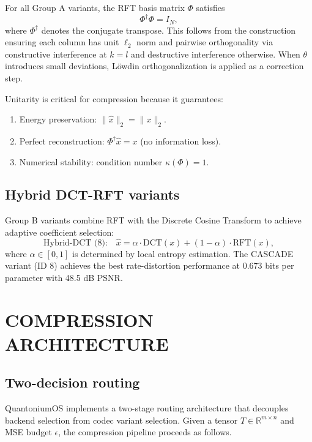 \documentclass[aip,twocolumn,letterpaper]{revtex4}
\begin{document}
For all Group A variants, the RFT basis matrix \(\Phi\) satisfies
\begin{equation}
\Phi^\dagger \Phi = I_N,
\label{eq:unitary}
\end{equation}
where \(\Phi^\dagger\) denotes the conjugate transpose. This follows from the construction ensuring each column has unit \(\ell_2\) norm and pairwise orthogonality via constructive interference at \(k=l\) and destructive interference otherwise. When \(\theta\) introduces small deviations, Löwdin orthogonalization is applied as a correction step.

Unitarity is critical for compression because it guarantees:
\begin{enumerate}
\item Energy preservation: \(\|\hat{x}\|_2 = \|x\|_2\).
\item Perfect reconstruction: \(\Phi^\dagger \hat{x} = x\) (no information loss).
\item Numerical stability: condition number \(\kappa(\Phi) = 1\).
\end{enumerate}

\subsection{Hybrid DCT-RFT variants}

Group B variants combine RFT with the Discrete Cosine Transform to achieve adaptive coefficient selection:
\begin{equation}
\text{Hybrid-DCT (8):} \quad \hat{x} = \alpha \cdot \mathrm{DCT}(x) + (1-\alpha) \cdot \mathrm{RFT}(x),
\label{eq:hybrid}
\end{equation}
where \(\alpha \in [0,1]\) is determined by local entropy estimation. The CASCADE variant (ID 8) achieves the best rate-distortion performance at 0.673 bits per parameter with 48.5 dB PSNR.

\section{COMPRESSION ARCHITECTURE}

\subsection{Two-decision routing}

QuantoniumOS implements a two-stage routing architecture that decouples backend selection from codec variant selection. Given a tensor \(T \in \mathbb{R}^{m \times n}\) and MSE budget \(\epsilon\), the compression pipeline proceeds as follows.
\end{document}
